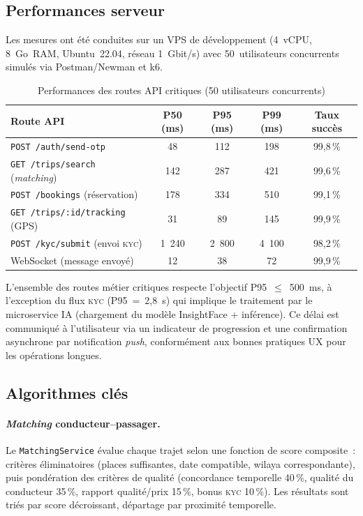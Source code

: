 \documentclass[12pt, a4paper, oneside]{report}
\begin{document}
\subsection{Performances serveur}

Les mesures ont été conduites sur un VPS de développement (4~vCPU, 8~Go~RAM, Ubuntu~22.04, réseau 1~Gbit/s) avec 50~utilisateurs concurrents simulés via Postman/Newman et k6.

\begin{table}[H]
\centering
\footnotesize
\begin{tabularx}{\textwidth}{|X|c|c|c|c|}
\hline
\rowcolor{rohlight}
\textbf{Route API} & \textbf{P50 (ms)} & \textbf{P95 (ms)} & \textbf{P99 (ms)} & \textbf{Taux succès} \\
\hline
\texttt{POST /auth/send-otp} & 48 & 112 & 198 & 99,8\,\% \\
\hline
\texttt{GET /trips/search} (\textit{matching}) & 142 & 287 & 421 & 99,6\,\% \\
\hline
\texttt{POST /bookings} (réservation) & 178 & 334 & 510 & 99,1\,\% \\
\hline
\texttt{GET /trips/:id/tracking} (GPS) & 31 & 89 & 145 & 99,9\,\% \\
\hline
\texttt{POST /kyc/submit} (envoi \textsc{kyc}) & 1~240 & 2~800 & 4~100 & 98,2\,\% \\
\hline
WebSocket (message envoyé) & 12 & 38 & 72 & 99,9\,\% \\
\hline
\end{tabularx}
  \caption{Performances des routes API critiques (50 utilisateurs concurrents)}
  \label{tab:perf}
\end{table}

L'ensemble des routes métier critiques respecte l'objectif P95~$\leq$~500~ms, à l'exception du flux \textsc{kyc} (P95~=~2,8~s) qui implique le traitement par le microservice IA (chargement du modèle InsightFace + inférence). Ce délai est communiqué à l'utilisateur via un indicateur de progression et une confirmation asynchrone par notification \textit{push}, conformément aux bonnes pratiques UX pour les opérations longues.

\subsection{Algorithmes clés}

\paragraph{\textit{Matching} conducteur--passager.} Le \texttt{MatchingService} évalue chaque trajet selon une fonction de score composite~: critères éliminatoires (places suffisantes, date compatible, wilaya correspondante), puis pondération des critères de qualité (concordance temporelle 40\,\%, qualité du conducteur 35\,\%, rapport qualité/prix 15\,\%, bonus \textsc{kyc} 10\,\%). Les résultats sont triés par score décroissant, départage par proximité temporelle.
\end{document}
